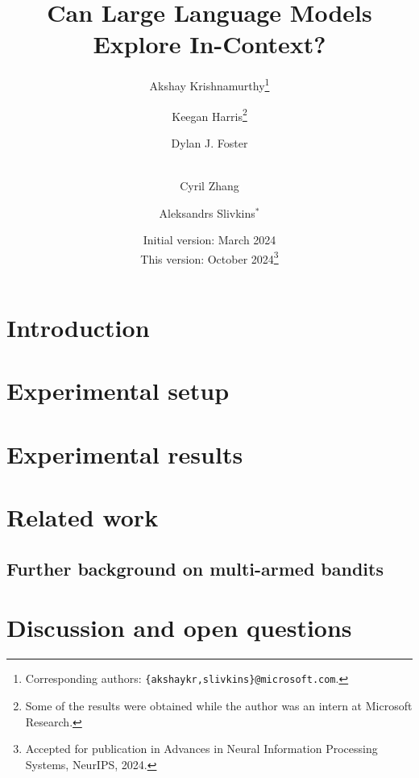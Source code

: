 \documentclass[11pt]{article}
\title{
Can Large Language Models Explore In-Context?}
\author[1]{Akshay Krishnamurthy\footnote{Corresponding authors: \texttt{\{akshaykr,slivkins\}@microsoft.com}.}}
\author[2]{Keegan Harris\footnote{Some of the results were obtained while the author was an intern at Microsoft Research.}}
\author[1]{Dylan J. Foster}
\author[1]{\\Cyril Zhang}
\author[1]{Aleksandrs Slivkins$^*$}
\affil[1]{\normalsize Microsoft Research}
\affil[2]{\normalsize Carnegie Mellon University}
\date{\vspace*{-3mm}\normalsize Initial version: March 2024\\This version: October 2024\footnote{Accepted for publication in Advances in Neural Information Processing Systems, NeurIPS, 2024.}\vspace*{-3mm}%
}
\begin{document}
\maketitle

\begin{abstract}

\end{abstract}

\section{Introduction}
\label{sec:intro}


\section{Experimental setup}
\label{sec:setup}


\section{Experimental results}
\label{sec:results}



\section{Related work}
\label{sec:related}


\subsection{Further background on multi-armed bandits}
\label{sec:bg}


\section{Discussion and open questions}
\label{sec:discussion}


\clearpage



\clearpage\newpage \clearpage\newpage \clearpage\newpage

\appendix


\end{document}
